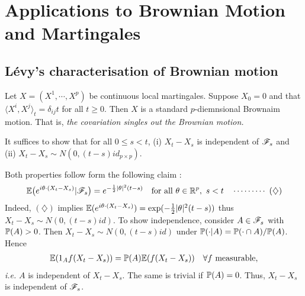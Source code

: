 \documentclass[10pt,a4paper]{article}
\newenvironment{proof}
{\begin{changemargin}{0.5cm}{0.5cm} 
	}%
	{\end{changemargin}
}
\newenvironment{p}
{\begin{proof} 
	}%
	{\end{proof}
}
\begin{document}
\section{Applications to Brownian Motion and Martingales}

\subsection{L\'evy's characterisation of Brownian motion}

\thm Let $X = (X^1, \cdots, X^p)$ be continuous local martingales. Suppose $X_0 = 0$ and that $\langle X^i, X^j \rangle_t = \delta_{ij} t$ for all $t\geq 0$. Then $X$ is a standard $p$-diemnsional Brownaim motion. That is, \emph{the covariation singles out the Brownian motion.}
\begin{p}
\pf It suffices to show that for all $0\leq s <t$, (i) $X_t - X_s$ is independent of $\mathscr{F}_s$ and (ii) $X_t - X_s \sim N(0, (t-s)id_{p \times p})$.

\quad Both properties follow form the following claim :
\begin{align*}
\mathbb{E} \big(e^{i\theta \cdot (X_t - X_s)} | \mathscr{F}_s \big) = e^{-\frac{1}{2} |\theta|^2 (t-s)} \quad \text{for all } \theta\in \mathbb{R}^p, \,\, s< t \quad \cdots\cdots\cdots\,\,(\diamondsuit)
\end{align*}
Indeed, $(\diamondsuit)$ implies $\mathbb{E} (e^{i\theta \cdot (X_t - X_s)}) = \exp (- \frac{1}{2} |\theta|^2 (t-s))$ thus $X_t - X_s \sim N(0, (t-s)id)$. To show independence, consider $A\in \mathscr{F}_s$ with $\mathbb{P} (A) > 0$. Then $X_t - X_s \sim N (0, (t-s)id)$ under $\mathbb{P} (\cdot |A) = \mathbb{P}(\cdot \cap A) / \mathbb{P}(A)$. Hence
\begin{align*}
\mathbb{E} (1_A f(X_t - X_s)) = \mathbb{P}(A) \mathbb{E}(f(X_t - X_s))\quad \forall f \text{ measurable},
\end{align*}
\textit{i.e.} $A$ is independent of $X_t - X_s$. The same is trivial if $\mathbb{P}(A) =0$. Thus, $X_t - X_s$ is independent of $\mathscr{F}_s$.
\s


\end{p}
\end{document}
